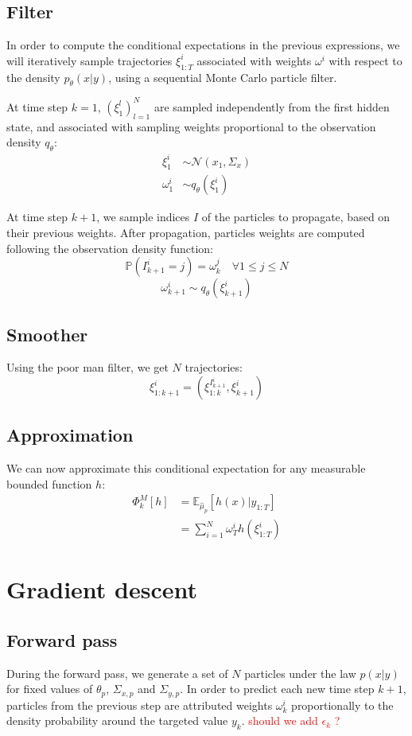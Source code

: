 \documentclass[10pt,a4paper]{report}
\begin{document}
\subsection{Filter}
In order to compute the conditional expectations in the previous expressions, we will iteratively sample trajectories $\xi_{1:T}^i$ associated with weights $\omega^i$ with respect to the density $p_\theta(x | y)$, using a sequential Monte Carlo particle filter.

At time step $k=1$, $(\xi_1^l)_{l=1}^N$ are sampled independently from the first hidden state, and associated with sampling weights proportional to the observation density $q_\theta$:
\begin{align*}
        \xi_1^i    & \sim \mathcal{N}(x_1, \Sigma_x) \\
        \omega_1^i & \sim q_\theta(\xi_1^i)
\end{align*}

At time step $k+1$, we sample indices $I$ of the particles to propagate, based on their previous weights.
After propagation, particles weights are computed following the observation density function:
$$\mathbb{P}(I_{k+1}^i=j) = \omega_k^j \quad \forall 1 \leq j \leq N$$
$$\omega_{k+1}^i \sim q_\theta(\xi_{k+1}^i)$$

\subsection{Smoother}
Using the poor man filter, we get $N$ trajectories:
$$\xi_{1:k+1}^{i} = (\xi_{1:k}^{I_{k+1}^i}, \xi_{k+1}^i)$$

\subsection{Approximation}
We can now approximate this conditional expectation for any measurable bounded function $h$:
\begin{align*}
        \Phi_k^M[h] & = \mathbb{E}_{\hat \mu_p} \left[ h(x) | y_{1:T} \right] \\
                    & = \sum_{i=1}^N \omega_T^i h(\xi_{1:T}^i)
\end{align*}

\section{Gradient descent}
\label{sec:gradient_descent}

\subsection{Forward pass}
During the forward pass, we generate a set of $N$ particles under the law $p(x|y)$ for fixed values of $\theta_p$, $\Sigma_{x, p}$ and $\Sigma_{y, p}$.
In order to predict each new time step $k+1$, particles from the previous step are attributed weights $\omega_k^i$ proportionally to the density probability around the targeted value $y_k$.
\textcolor{red}{should we add $\epsilon_k$ ?}
\end{document}

